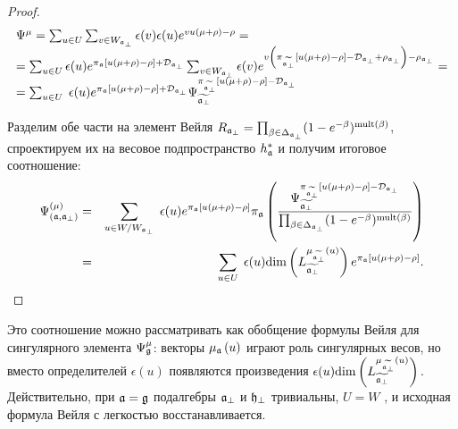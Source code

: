\begin{proof}
\begin{equation*}
\begin{array}{l}
\Psi^{\mu }=\sum_{u\in U}\sum_{v\in W_{\af_{\perp }}}
\epsilon (v)\epsilon (u)e^{vu(\mu +\rho )-\rho }= \\
=\sum_{u\in U}\epsilon (u)e^{\pi _{\af}\left[ u(\mu +\rho )-\rho \right]
+\mathcal{D}_{\af_{\perp }}}\sum_{v\in W_{\af_{\perp }}}\epsilon
(v)e^{v\left( \pi _{ \widetilde{\af_{\perp }} }\left[
u(\mu +\rho )-\rho \right] -\mathcal{D}_{\af_{\perp }}+\rho _{\af%
_{\perp }}\right) -\rho _{\af_{\perp }}}= \\
=\sum_{u\in U}\;\epsilon (u)e^{\pi _{\af }\left[ u(\mu
+\rho )-\rho \right] +\mathcal{D}_{\af_{\perp }}}\Psi _{\widetilde{%
\af_{\perp }}}^{\pi _{ \widetilde{\af_{\perp }} }%
\left[ u(\mu +\rho )-\rho \right] -\mathcal{D}_{\af_{\perp }}}
\end{array}
\end{equation*}

Разделим обе части на элемент Вейля  $R_{\mathfrak{a}_{\perp }}=\prod_{\beta \in \Delta _{\mathfrak{a}_{\perp}}}(1-e^{-\beta })^{\mathrm{mult}(\beta )}$, спроектируем их на весовое подпространство  $h_{\mathfrak{a}}^{\ast }$ и получим итоговое соотношение:
\begin{eqnarray*}
\Psi ^{\left( \mu \right) }_{\left(  \af, \afb \right)}
&=&\sum_{u\in W/W_{\af_{\perp }}}\;\epsilon (u)e^{\pi _{\frak{a%
}}\left[ u(\mu +\rho )-\rho \right] }\pi _{%
\af}\left( \frac{\Psi _{\widetilde{\af_{\perp }}}^{\pi _{
\widetilde{\af_{\perp }} }\left[ u(\mu +\rho )-\rho \right] -%
\mathcal{D}_{\af_{\perp }}}}{\prod_{\beta \in \Delta _{\af_{\perp
}}}(1-e^{-\beta })^{\mathrm{mult}(\beta )}}\right)  \\
&=&\sum_{u\in U}\;\epsilon (u)\mathrm{\dim }\left( L_{\widetilde{\af%
_{\perp }}}^{\mu _{\widetilde{\af_{\perp }}}\left( u\right) }\right)
e^{\pi _{\af}\left[ u(\mu +\rho )-\rho \right] }.
\end{eqnarray*}
\end{proof}


\begin{remark}
Это соотношение можно рассматривать как обобщение формулы Вейля для сингулярного элемента  $\Psi _{\mathfrak{g}}^{\mu }$: векторы  $\mu_{\mathfrak{a}}\left(u\right)$ играют роль сингулярных весов, но вместо определителей $\epsilon (u)$ появляются произведения  $\epsilon(u)\mathrm{\dim }\left( L_{\widetilde{\mathfrak{a}_{\perp}}}^{\mu _{\widetilde{\mathfrak{a}_{\perp}}}\left(u\right) }\right).$ Действительно, при  $\frak{a=g}$ подалгебры  $\mathfrak{a}_{\perp}$ и $\mathfrak{h}_{\perp }$ тривиальны, $U=W$ , и исходная формула Вейля с легкостью восстанавливается. 
\end{remark}

